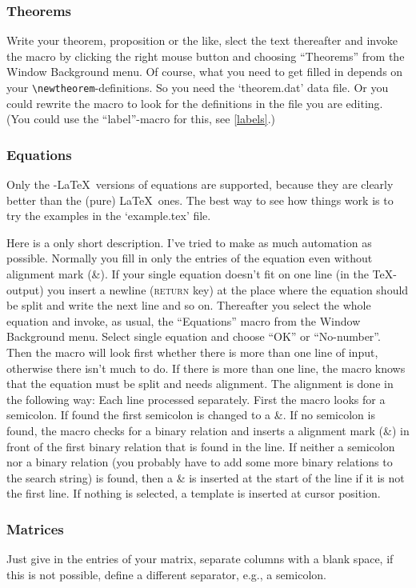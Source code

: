\documentclass{article}
\newcommand{\keyname}[1]{\textsc{#1}}
\begin{document}
\subsubsection{Theorems}
Write your theorem, proposition or the like, slect the text thereafter and invoke the macro by clicking the right mouse button and choosing ``Theorems'' from the Window Background menu. Of course, what you need to get filled in depends on your \verb|\newtheorem|-definitions. So you need the `theorem.dat' data file. Or you could rewrite the macro to look for the definitions in the file you are editing. (You could use the ``label''-macro for this, see \ref{labels}.)

\subsubsection{Equations}
Only the \AmS-\LaTeX\ versions of equations are supported, because they are clearly better than the (pure) \LaTeX\ ones. The best way to see how things work is to try the examples in the `example.tex' file. 

Here is a only short description. I've tried to make as much automation as possible. Normally you fill in only the entries of the equation even without alignment mark (\&). If your single equation doesn't fit on one line (in the \TeX-output) you insert a newline (\keyname{return} key) at the place where the equation should be split and write the next line and so on. Thereafter you select the whole equation and invoke, as usual, the ``Equations'' macro from the Window Background menu. Select single equation and choose ``OK'' or ``No-number''. Then the macro will look first whether there is more than one line of input, otherwise there isn't much to do. If there is more than one line, the macro knows that the equation must be split and needs alignment. The alignment is done in the following way: Each line processed separately. First the macro looks for a semicolon. If found the first semicolon is changed to a \&. If no semicolon is found,
the macro checks for a binary relation and inserts a alignment mark (\&) in front of the first binary relation that is found in the line. If neither a semicolon nor a binary relation (you probably have to add some more binary relations to the search string) is found, then a \& is inserted at the start of the line if it is not the first line.
If nothing is selected, a template is inserted at cursor position.

\subsubsection{Matrices}
Just give in the entries of your matrix, separate columns with a blank space, if this is not possible, define a different separator, e.g., a semicolon. 
\end{document}
